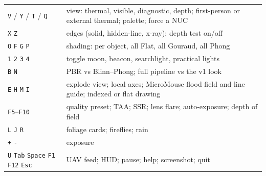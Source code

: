 \begin{table}[h]
\begin{tabular}{@{}p{3.6cm}p{12.4cm}@{}}
\texttt{V} / \texttt{Y} / \texttt{T} / \texttt{Q} & view: thermal, visible, diagnostic, depth; first-person or external thermal; palette; force a NUC\\
\texttt{X} \texttt{Z} & edges (solid, hidden-line, x-ray); depth test on/off\\
\texttt{O} \texttt{F} \texttt{G} \texttt{P} & shading: per object, all Flat, all Gouraud, all Phong\\
\texttt{1} \texttt{2} \texttt{3} \texttt{4} & toggle moon, beacon, searchlight, practical lights\\
\texttt{B} \texttt{N} & PBR vs Blinn--Phong; full pipeline vs the v1 look\\
\texttt{E} \texttt{H} \texttt{M} \texttt{I} & explode view; local axes; MicroMouse flood field and line guide; indexed or flat drawing\\
\texttt{F5}--\texttt{F10} & quality preset; TAA; SSR; lens flare; auto-exposure; depth of field\\
\texttt{L} \texttt{J} \texttt{R} & foliage cards; fireflies; rain\\
\texttt{+} \texttt{-} & exposure\\
\texttt{U} \texttt{Tab} \texttt{Space} \texttt{F1} \texttt{F12} \texttt{Esc} & UAV feed; HUD; pause; help; screenshot; quit\\\bottomrule
\end{tabular}
\end{table}

\begin{table}[h]
\centering\small
\caption{Keys added in v6 (generated from , the same table as  and the F1 overlay). Command line: , , , .}
\label{tab:keysv6}
\tabVsixKeys
\end{table}

